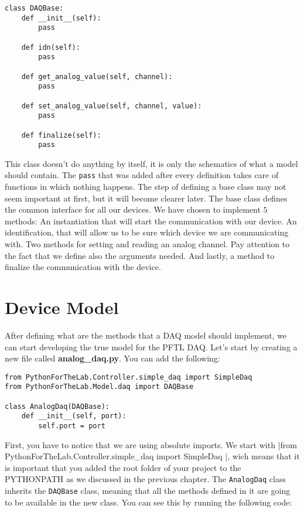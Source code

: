 \begin{verbatim}
class DAQBase:
    def __init__(self):
        pass
    
    def idn(self):
        pass
    
    def get_analog_value(self, channel):
        pass
    
    def set_analog_value(self, channel, value):
        pass
    
    def finalize(self):
        pass
\end{verbatim}

This class doesn't do anything by itself, it is only the schematics of what a model should contain. The \texttt{pass} that was added after every definition takes care of functions in which nothing happens. The step of defining a base class may not seem important at first, but it will become clearer later. The base class defines the common interface for all our devices. We have chosen to implement $5$ methods: An instantiation that will start the communication with our device. An identification, that will allow us to be sure which device we are communicating with. Two methods for setting and reading an analog channel. Pay attention to the fact that we define also the arguments needed. And lastly, a method to finalize the communication with the device.  

\section{Device Model}\label{devicemodel}
After defining what are the methods that a DAQ model should implement, we can start developing the true model for the {PFTL DAQ}. Let's start by creating a new file called \textbf{analog\_daq.py}. You can add the following:

\begin{verbatim}
from PythonForTheLab.Controller.simple_daq import SimpleDaq 
from PythonForTheLab.Model.daq import DAQBase

class AnalogDaq(DAQBase):
    def __init__(self, port):
        self.port = port
\end{verbatim}

First, you have to notice that we are using absolute imports. We start with |from PythonForTheLab.Controller.simple_daq import SimpleDaq |, wich means that it is important that you added the root folder of your project to the PYTHONPATH as we discussed in the previous chapter. The \texttt{AnalogDaq} class inherits the \texttt{DAQBase} class, meaning that all the methods defined in it are going to be available in the new class. You can see this by running the following code:

